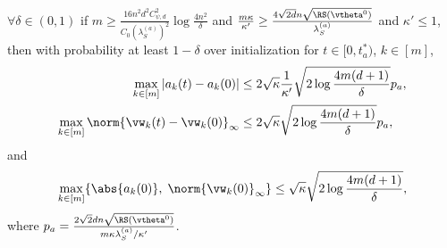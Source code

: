 \documentclass{article}
\begin{document}
\begin{prop}
    $\forall\delta\in(0,1)$ if $m\geq\frac{16n^2d^2C^2_{\psi,d}}{C_0(\lambda_S^{(a)})^2}\log\frac{4n^2}{\delta}$ and $\frac{m\kappa}{\kappa'}\geq\frac{4\sqrt{2d}n\sqrt{\RS(\vtheta^0)}}{\lambda_S^{(a)}}$ and $\kappa'\leq 1$, then with probability at least $1-\delta$ over initialization for $t\in[0,t^*_a)$, $k\in[m]$,
    \begin{equation}
        \begin{aligned}
            \max\limits_{k\in[m]}|a_k(t) - a_k(0)|
             & \leq 2\sqrt{\kappa}\frac{1}{\kappa'}\sqrt{2\log\frac{4m(d+1)}{\delta}}p_a, \\
            \max\limits_{k\in[m]}\norm{\vw_k(t) - \vw_k(0)}_{\infty}
             & \leq 2\sqrt{\kappa}\sqrt{2\log\frac{4m(d+1)}{\delta}}p_a,
        \end{aligned}
    \end{equation}
    and
    \begin{equation}
        \max\limits_{k\in[m]}\{\abs{a_k(0)},\;\norm{\vw_k(0)}_{\infty}\} \leq \sqrt{\kappa}\sqrt{2\log\frac{4m(d+1)}{\delta}},
    \end{equation}
    where $p_a=\frac{2\sqrt{2}dn\sqrt{\RS(\vtheta^0)}}{m\kappa\lambda_S^{(a)}/\kappa'}$.
\end{prop}
\end{document}

